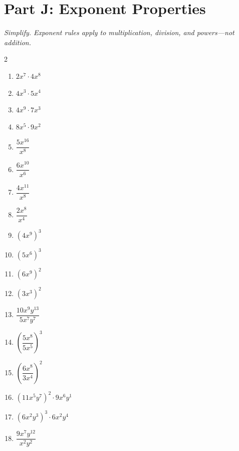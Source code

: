 \documentclass[11pt]{article}
\begin{document}
\section*{Part J: Exponent Properties}
\noindent\textit{Simplify. Exponent rules apply to multiplication, division, and powers---not addition.}
\begin{multicols}{2}
\begin{enumerate}
  \item $2x^{7} \cdot 4x^{8}$
  \vspace{1.3cm}
  \item $4x^{3} \cdot 5x^{4}$
  \vspace{1.3cm}
  \item $4x^{9} \cdot 7x^{3}$
  \vspace{1.3cm}
  \item $8x^{5} \cdot 9x^{2}$
  \vspace{1.3cm}
  \item $\dfrac{5x^{16}}{x^{8}}$
  \vspace{1.3cm}
  \item $\dfrac{6x^{10}}{x^{6}}$
  \vspace{1.3cm}
  \item $\dfrac{4x^{11}}{x^{8}}$
  \vspace{1.3cm}
  \item $\dfrac{2x^{8}}{x^{4}}$
  \vspace{1.3cm}
  \item $(4x^{9})^{3}$
  \vspace{1.3cm}
  \item $(5x^{6})^{3}$
  \vspace{1.3cm}
  \item $(6x^{9})^{2}$
  \vspace{1.3cm}
  \item $(3x^{3})^{2}$
  \vspace{1.3cm}
  \item $\dfrac{10x^{9}y^{13}}{5x^{7}y^{7}}$
  \vspace{1.3cm}
  \item $\left(\dfrac{5x^{8}}{5x^{5}}\right)^{3}$
  \vspace{1.3cm}
  \item $\left(\dfrac{6x^{8}}{3x^{4}}\right)^{2}$
  \vspace{1.3cm}
  \item $(11x^{5}y^{7})^{2} \cdot 9x^{6}y^{1}$
  \vspace{1.3cm}
  \item $(6x^{2}y^{3})^{3} \cdot 6x^{2}y^{4}$
  \vspace{1.3cm}
  \item $\dfrac{9x^{7}y^{12}}{x^{2}y^{2}}$
  \vspace{1.3cm}
\end{enumerate}
\end{multicols}
\end{document}

